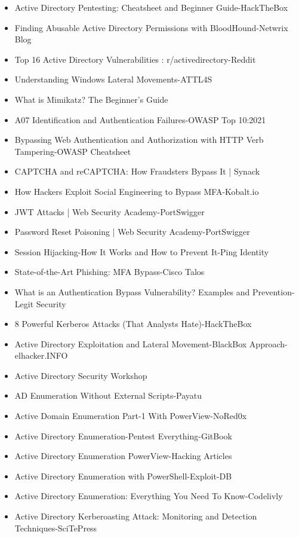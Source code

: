 \begin{itemize}
    \item Active Directory Pentesting: Cheatsheet and Beginner Guide-HackTheBox
    \item Finding Abusable Active Directory Permissions with BloodHound-Netwrix Blog
    \item Top 16 Active Directory Vulnerabilities : r/activedirectory-Reddit
    \item Understanding Windows Lateral Movements-ATTL4S
    \item What is Mimikatz? The Beginner's Guide
    \item A07 Identification and Authentication Failures-OWASP Top 10:2021
    \item Bypassing Web Authentication and Authorization with HTTP Verb Tampering-OWASP Cheatsheet
    \item CAPTCHA and reCAPTCHA: How Fraudsters Bypass It | Synack
    \item How Hackers Exploit Social Engineering to Bypass MFA-Kobalt.io
    \item JWT Attacks | Web Security Academy-PortSwigger
    \item Password Reset Poisoning | Web Security Academy-PortSwigger
    \item Session Hijacking-How It Works and How to Prevent It-Ping Identity
    \item State-of-the-Art Phishing: MFA Bypass-Cisco Talos
    \item What is an Authentication Bypass Vulnerability? Examples and Prevention-Legit Security
    \item 8 Powerful Kerberos Attacks (That Analysts Hate)-HackTheBox
    \item Active Directory Exploitation and Lateral Movement-BlackBox Approach-elhacker.INFO
    \item Active Directory Security Workshop
    \item AD Enumeration Without External Scripts-Payatu
    \item Active Domain Enumeration Part-1 With PowerView-NoRed0x
    \item Active Directory Enumeration-Pentest Everything-GitBook
    \item Active Directory Enumeration PowerView-Hacking Articles
    \item Active Directory Enumeration with PowerShell-Exploit-DB
    \item Active Directory Enumeration: Everything You Need To Know-Codelivly
    \item Active Directory Kerberoasting Attack: Monitoring and Detection Techniques-SciTePress

\end{itemize}
